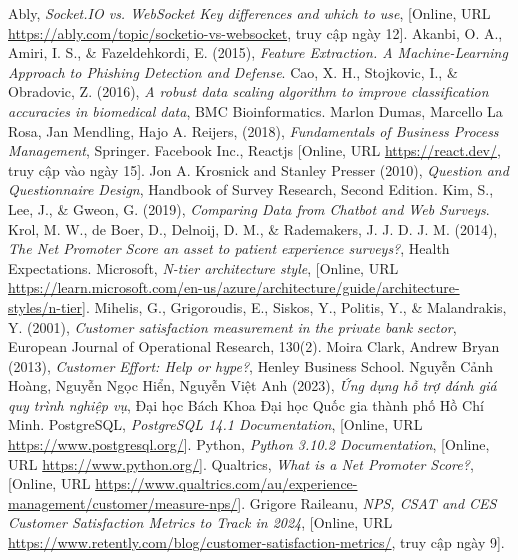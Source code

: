 \begin{thebibliography}{9}
     Ably, \textit{Socket.IO vs. WebSocket\: Key differences and which to use}, [Online, URL\: \url{https://ably.com/topic/socketio-vs-websocket}, truy cập ngày 12].
     Akanbi, O. A., Amiri, I. S., \& Fazeldehkordi, E. (2015), \textit{Feature Extraction. A Machine-Learning Approach to Phishing Detection and Defense}.
     Cao, X. H., Stojkovic, I., \& Obradovic, Z. (2016), \textit{A robust data scaling algorithm to improve classification accuracies in biomedical data}, BMC Bioinformatics.
     Marlon Dumas, Marcello La Rosa, Jan Mendling, Hajo A. Reijers, (2018), \textit{Fundamentals of Business Process Management}, Springer.
     Facebook Inc., Reactjs [Online, URL\: \url{https://react.dev/}, truy cập vào ngày 15].
     Jon A. Krosnick and Stanley Presser (2010), \textit{Question and Questionnaire Design}, Handbook of Survey Research, Second Edition.
     Kim, S., Lee, J., \& Gweon, G. (2019), \textit{Comparing Data from Chatbot and Web Surveys}.
     Krol, M. W., de Boer, D., Delnoij, D. M., \& Rademakers, J. J. D. J. M. (2014), \textit{The Net Promoter Score \- an asset to patient experience surveys?}, Health Expectations.
     Microsoft, \textit{N-tier architecture style}, [Online, URL\: \url{https://learn.microsoft.com/en-us/azure/architecture/guide/architecture-styles/n-tier}].
     Mihelis, G., Grigoroudis, E., Siskos, Y., Politis, Y., \& Malandrakis, Y. (2001), \textit{Customer satisfaction measurement in the private bank sector}, European Journal of Operational Research, 130(2).
     Moira Clark, Andrew Bryan (2013), \textit{Customer Effort: Help or hype?}, Henley Business School.
     Nguyễn Cảnh Hoàng, Nguyễn Ngọc Hiển, Nguyễn Việt Anh (2023), \textit{Ứng dụng hỗ trợ đánh giá quy trình nghiệp vụ}, Đại học Bách Khoa Đại học Quốc gia thành phố Hồ Chí Minh.
     PostgreSQL, \textit{PostgreSQL 14.1 Documentation}, [Online, URL\: \url{https://www.postgresql.org/}].
     Python, \textit{Python 3.10.2 Documentation}, [Online, URL\: \url{https://www.python.org/}].
     Qualtrics, \textit{What is a Net Promoter Score?}, [Online, URL\: \url{https://www.qualtrics.com/au/experience-management/customer/measure-nps/}].
     Grigore Raileanu, \textit{NPS, CSAT and CES \- Customer Satisfaction Metrics to Track in 2024}, [Online, URL\: \url{https://www.retently.com/blog/customer-satisfaction-metrics/}, truy cập ngày 9].

\end{thebibliography}
